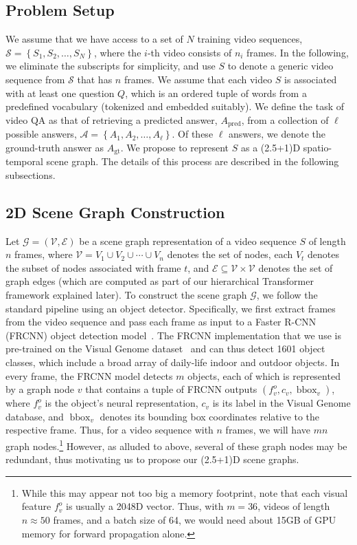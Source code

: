 \documentclass[letterpaper]{article} \usepackage{aaai22}  \usepackage{times}  \usepackage{helvet}  \usepackage{courier}  \usepackage[hyphens]{url}  \usepackage{graphicx} \urlstyle{rm} \def\UrlFont{\rm}  \usepackage{natbib}  \usepackage{caption} \DeclareCaptionStyle{ruled}{labelfont=normalfont,labelsep=colon,strut=off} \frenchspacing  \setlength{\pdfpagewidth}{8.5in}  \setlength{\pdfpageheight}{11in}  \usepackage{algorithm}
\newcommand{\videoset}{\mathcal{S}}
\newcommand{\ansset}{\mathcal{A}}
\newcommand{\V}{{S}}
\newcommand{\Q}{{Q}}
\newcommand{\A}{{A}}
\newcommand{\Ap}{{A_{\text{pred}}}}
\newcommand{\Agt}{{A_{\text{gt}}}}
\newcommand{\fo}{f^o}
\newcommand{\graph}{\mathcal{G}}
\newcommand{\name}{(2.5+1)D\xspace}
\newcommand{\vset}{\mathcal{V}}
\newcommand{\nodes}{V}
\newcommand{\node}{v}
\newcommand{\eset}{\mathcal{E}}
\newcommand{\set}[1]{\left\{#1\right\}}
\DeclareMathOperator{\bbox}{bbox}
\begin{document}
\subsection{Problem Setup}
We assume that we have access to a set of $N$ training video sequences, $\videoset=\set{\V_1, \V_2, \dots, \V_N}$, where the $i$-th video consists of $n_i$ frames. In the following, we eliminate the subscripts for simplicity, and use $\V$ to denote a generic video sequence from $\videoset$ that has $n$ frames. We assume that each video $\V$ is associated with at least one question $\Q$, which is an ordered tuple of words from a predefined vocabulary (tokenized and embedded suitably). We define the task of video QA as that of retrieving a predicted answer, $\Ap$, from a collection of $\ell$ possible answers, $\ansset=\set{\A_1, \A_2, \dots, \A_\ell}$. Of these $\ell$ answers, we denote the ground-truth answer as $\Agt$. We propose to represent $\V$ as a \name spatio-temporal scene graph. The details of this process are described in the following subsections.

\subsection{2D Scene Graph Construction}
Let $\graph=(\vset, \eset)$ be a scene graph representation of a video sequence $\V$ of length $n$ frames, where $\vset = \nodes_1\cup \nodes_2\cup\cdots \cup\nodes_n$ denotes the set of nodes, each $\nodes_t$ denotes the subset of nodes associated with frame $t$, and $\eset\subseteq \vset\times \vset$ denotes the set of graph edges (which are computed as part of our hierarchical Transformer framework explained later). To construct the scene graph $\graph$, we follow the standard pipeline using an object detector. Specifically, we first extract frames from the video sequence and pass each frame as input to a Faster R-CNN (FRCNN) object detection model~\cite{ren2015faster}. The FRCNN implementation that we use is pre-trained on the Visual Genome dataset~\cite{anderson2018bottom} and can thus detect 1601 object classes, which include a broad array of daily-life indoor and outdoor objects. In every frame, the FRCNN model detects $m$ objects, each of which is represented by a graph node $\node$ that contains a tuple of FRCNN outputs $(\fo_\node, c_\node, \bbox_\node)$, where $\fo_\node$ is the object's neural representation, $c_\node$ is its label in the Visual Genome database, and $\bbox_\node$ denotes its bounding box coordinates relative to the respective frame. Thus, for a video sequence with $n$ frames, we will have $mn$ graph nodes.\footnote{While this may appear not too big a memory footprint, note that each visual feature $\fo_\node$ is usually a 2048D vector. Thus, with $m=36$, videos of length $n \approx 50$ frames, and a batch size of 64, we would need about 15GB of GPU memory for forward propagation alone.} However, as alluded to above, several of these graph nodes may be redundant, thus motivating us to propose our \name scene graphs.
\end{document}
